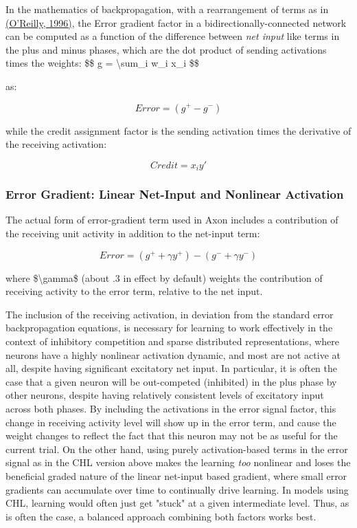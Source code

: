 \documentclass[11pt,twoside]{article}
\newif\myifpdf
\begin{document}
In the mathematics of backpropagation, with a rearrangement of terms as in \protect\hyperlink{references}{(O'Reilly, 1996)}, the Error gradient factor in a bidirectionally-connected network can be computed as a function of the difference between \emph{net input} like terms in the plus and minus phases, which are the dot product of sending activations times the weights: 
\$\$ g = \textbackslash sum\_i w\_i x\_i \$\$

as:

\begin{equation}
Error = (g^+ - g^-)
\end{equation}

while the credit assignment factor is the sending activation times the derivative of the receiving activation:

\begin{equation}
Credit = x_i y'
\end{equation}

\subsubsection{Error Gradient: Linear Net-Input and Nonlinear Activation}

The actual form of error-gradient term used in Axon includes a contribution of the receiving unit activity in addition to the net-input term:

\begin{equation}
Error = (g^+ + \gamma y^+) - (g^- + \gamma y^-)
\end{equation}

where \$\textbackslash gamma\$ (about .3 in effect by default) weights the contribution of receiving activity to the error term, relative to the net input.

The inclusion of the receiving activation, in deviation from the standard error backpropagation equations, is necessary for learning to work effectively in the context of inhibitory competition and sparse distributed representations, where neurons have a highly nonlinear activation dynamic, and most are not active at all, despite having significant excitatory net input. In particular, it is often the case that a given neuron will be out-competed (inhibited) in the plus phase by other neurons, despite having relatively consistent levels of excitatory input across both phases. By including the activations in the error signal factor, this change in receiving activity level will show up in the error term, and cause the weight changes to reflect the fact that this neuron may not be as useful for the current trial. On the other hand, using purely activation-based terms in the error signal as in the CHL version above makes the learning \emph{too} nonlinear and loses the beneficial graded nature of the linear net-input based gradient, where small error gradients can accumulate over time to continually drive learning. In models using CHL, learning would often just get "stuck" at a given intermediate level. Thus, as is often the case, a balanced approach combining both factors works best.
\end{document}
